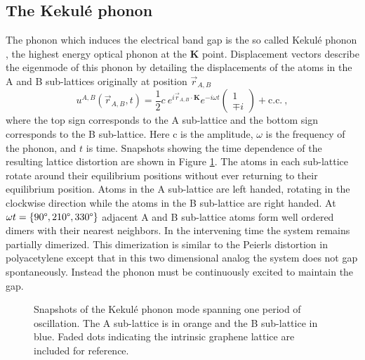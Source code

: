 \subsection{The Kekul\'e phonon}
The phonon which induces the electrical band gap is the so called Kekul\'e phonon \cite{Hou2007}, the highest energy optical phonon at the $\bm{K}$ point.
Displacement vectors describe the eigenmode of this phonon by detailing the displacements of the atoms in the A and B sub-lattices originally at position $\vec{r}_{A,B}$
\begin{equation}
	u^{A,B}(\vec{r}_{A,B},t)=\frac{1}{2} c \ e^{i \vec{r}_{A,B} \cdot \bm{K}} e^{-i \omega t} 
		\left( \begin{array}{c}
			1 \\
			\mp i
		\end{array} \right)
	 + \text{c.c.} \label{eq:kek:displacements} \ ,
\end{equation}
where the top sign corresponds to the A sub-lattice and the bottom sign corresponds to the B sub-lattice.
Here c is the amplitude, $\omega$ is the frequency of the phonon, and $t$ is time.
Snapshots showing the time dependence of the resulting lattice distortion are shown in Figure \ref{fig:kek:snapshots}.
The atoms in each sub-lattice rotate around their equilibrium positions without ever returning to their equilibrium position.
Atoms in the A sub-lattice are left handed, rotating in the clockwise direction while the atoms in the B sub-lattice are right handed.
At $\omega t=\{90 \text{\textdegree}, 210 \text{\textdegree}, 330 \text{\textdegree} \}$ adjacent A and B sub-lattice atoms form well ordered dimers with their nearest neighbors.
In the intervening time the system remains partially dimerized.
This dimerization is similar to the Peierls distortion in polyacetylene except that in this two dimensional analog the system does not gap spontaneously.
Instead the phonon must be continuously excited to maintain the gap.

\begin{figure}
	\begin{center}
	
	\end{center}
	\caption[Snapshots of the Kekul\'e phonon mode]{\label{fig:kek:snapshots}
		Snapshots of the Kekul\'e phonon mode spanning one period of oscillation.
		The A sub-lattice is in orange and the B sub-lattice in blue.
		Faded dots indicating the intrinsic graphene lattice are included for reference.}
\end{figure}

